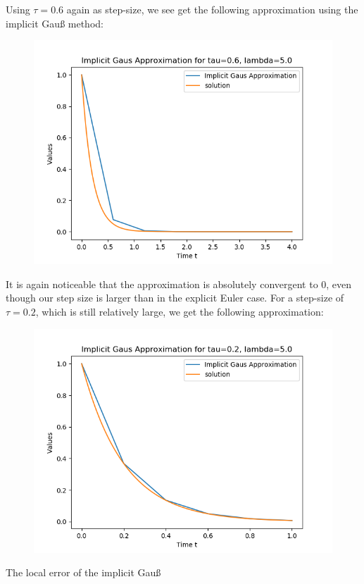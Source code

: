 \documentclass{article}
\theoremstyle{definition}
\begin{document}
\begin{itemize}
		Using $\tau = 0.6$ again as step-size, we see get the
		following approximation using
		the implicit Gau{\ss} method:
		\begin{figure}[H]
			\includegraphics[scale=0.6]{implicit_gauss_06}
		\end{figure}
		It is again
		noticeable that the approximation is absolutely convergent to
		$0$, even though our step size is larger than in the explicit
		Euler case. For a step-size of $\tau=0.2$, which is still
		relatively large, we get the following approximation:
		\begin{figure}[H]
			\includegraphics[scale=0.6]{implicit_gauss_02}
		\end{figure}
		The local error of the implicit Gau{\ss}

\end{itemize}
\end{document}

